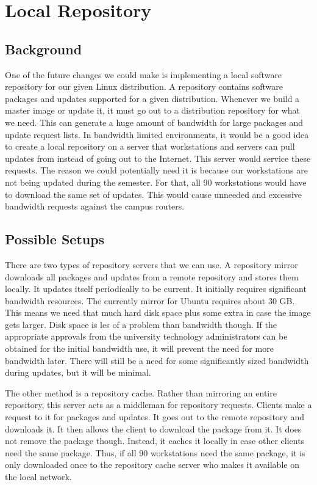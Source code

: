 \section{Local Repository}\label{sec:local_repository}
\subsection{Background}
One of the future changes we could make is implementing a local software repository for our given Linux distribution.  A repository contains software packages and updates supported for a given distribution.  Whenever we build a master image or update it, it must go out to a distribution repository for what we need.  This can generate a huge amount of bandwidth for large packages and update request lists.  In bandwidth limited environments, it would be a good idea to create a local repository on a server that workstations and servers can pull updates from instead of going out to the Internet.  This server would service these requests.  The reason we could potentially need it is because our workstations are not being updated during the semester.  For that, all 90 workstations would have to download the same set of updates.  This would cause unneeded and excessive bandwidth requests against the campus routers.  

\subsection{Possible Setups}
There are two types of repository servers that we can use.  A repository mirror downloads all packages and updates from a remote repository and stores them locally.  It updates itself periodically to be current.  It initially requires significant bandwidth resources.  The currently mirror for Ubuntu requires about 30 GB.  This means we need that much hard disk space plus some extra in case the image gets larger.  Disk space is les of a problem than bandwidth though.  If the appropriate approvals from the university technology administrators can be obtained for the initial bandwidth use, it will prevent the need for more bandwidth later.  There will still be a need for some significantly sized bandwidth during updates, but it will be minimal.  

\vfill\eject

The other method is a repository cache.  Rather than mirroring an entire repository, this server acts as a middleman for repository requests.  Clients make a request to it for packages and updates.  It goes out to the remote repository and downloads it.  It then allows the client to download the package from it.  It does not remove the package though.  Instead, it caches it locally in case other clients need the same package.  Thus, if all 90 workstations need the same package, it is only downloaded once to the repository cache server who makes it available on the local network.  

